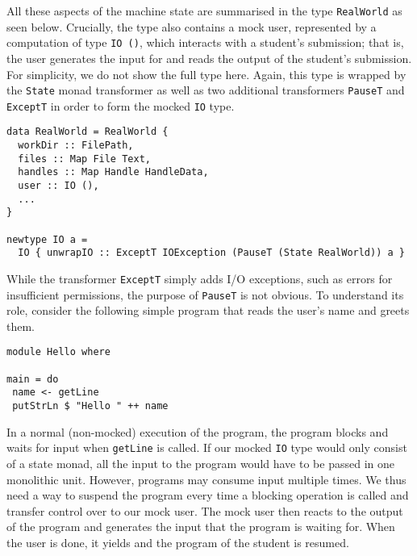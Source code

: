 All these aspects of the machine state are summarised in the type \texttt{RealWorld} as seen below.
Crucially, the type also contains a mock user,
represented by a computation of type \texttt{IO ()},
which interacts with a student's submission;
that is, the user generates the input for and reads the output of the student's submission.
For simplicity, we do not show the full type here.
Again, this type is wrapped by the \texttt{State} monad transformer as well as two additional transformers \texttt{PauseT} and \texttt{ExceptT} in order to form the mocked \texttt{IO} type.
\begin{verbatim}
data RealWorld = RealWorld {
  workDir :: FilePath,
  files :: Map File Text,
  handles :: Map Handle HandleData,
  user :: IO (),
  ...
}

newtype IO a =
  IO { unwrapIO :: ExceptT IOException (PauseT (State RealWorld)) a }
\end{verbatim}
While the transformer \texttt{ExceptT} simply adds I/O exceptions,
such as errors for insufficient permissions,
the purpose of \texttt{PauseT} is not obvious.
To understand its role, consider the following simple program that reads the user's name and greets them.
\begin{verbatim}
module Hello where

main = do
 name <- getLine
 putStrLn $ "Hello " ++ name
\end{verbatim}
In a normal (non-mocked) execution of the program, the program blocks and waits for input when \texttt{getLine} is called.
If our mocked \texttt{IO} type would only consist of a state monad,
all the input to the program would have to be passed in one monolithic unit.
However, programs may consume input multiple times.
We thus need a way to suspend the program every time a blocking operation is called and transfer control over to our mock user.
The mock user then reacts to the output of the program and generates the input that the program is waiting for.
When the user is done, it yields and the program of the student is resumed.

